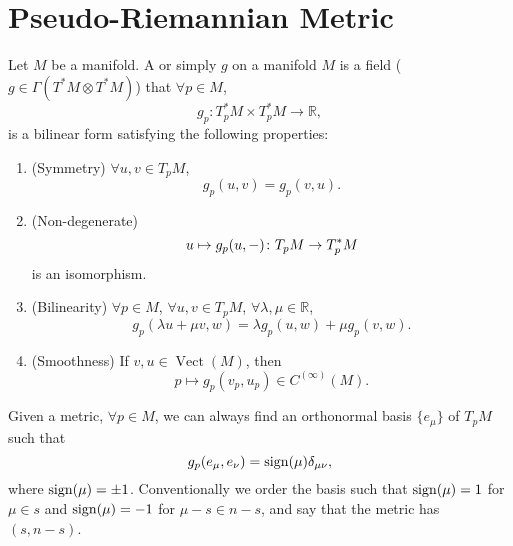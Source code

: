 \documentclass[openany, oneside, a5paper]{book}
\DeclareMathOperator{\Vect}{Vect}
\begin{document}
\section{Pseudo-Riemannian Metric}
\begin{definition}
    Let $M$ be a manifold.
    A  or simply  $g$ on a manifold $M$ is a field ($g \in \Gamma(T^*M \otimes T^*M)$) that $\forall p \in M$, 
    \begin{equation}
        g_p \colon T^*_p M \times T^*_p M \to \mathbb R, 
    \end{equation}
    is a bilinear form satisfying the following properties:
    \begin{enumerate}[label=(\alph*)]
        \item (Symmetry) $\forall u, v \in T_p M$,
        \begin{equation}
            g_p(u, v) = g_p(v, u).
        \end{equation}
        \item (Non-degenerate)
        \begin{equation}
            u \mapsto g_p(u, -) \colon T_p M \to T^*_p M 
        \end{equation}
        is an isomorphism.
        \item (Bilinearity) $\forall p \in M$, $\forall u, v \in T_p M$, $\forall \lambda, \mu \in \mathbb R$,
        \begin{equation}
            g_p(\lambda u + \mu v, w) = \lambda g_p(u, w) + \mu g_p(v, w).
        \end{equation}
        \item (Smoothness) If $v, u \in \Vect(M)$, then
        \begin{equation}
            p \mapsto g_p(v_p, u_p) \in C^{(\infty)}(M).
        \end{equation}
    \end{enumerate}
\end{definition}

Given a metric, $\forall p \in M$, we can always find an orthonormal basis $\{e_\mu\}$ of $T_p M$ such that
\begin{equation}
    g_p(e_\mu, e_\nu) = \operatorname{sign}(\mu) \delta_{\mu\nu},
\end{equation}
where $\operatorname{sign}(\mu) = \pm 1$.
Conventionally we order the basis such that $\operatorname{sign}(\mu) = 1$ for $\mu \in s$ and $\operatorname{sign}(\mu) = -1$ for $\mu - s \in n - s$, and say that the metric has  $(s, n - s)$.
\end{document}
